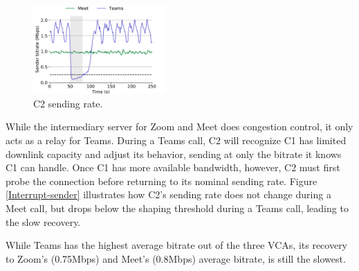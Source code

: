 \begin{figure}[]
    \centering
    \includegraphics[width=0.45\textwidth,keepaspectratio]{../figures/interrupt/Interrupt-sender.pdf}
    \caption{C2 sending rate.}
    \label{fig:Interrupt-sender}
\end{figure}

While the intermediary server for Zoom and Meet does congestion control, it only acts as a relay for Teams. During a Teams call, C2 will recognize C1 has limited downlink capacity and adjust its behavior, sending at only the bitrate it knows C1 can handle. Once C1 has more available bandwidth, however, C2 must first probe the connection before returning to its nominal sending rate. Figure \ref{Interrupt-sender} illustrates how C2's sending rate does not change during a Meet call, but drops below the shaping threshold during a Teams call, leading to the slow recovery.

While Teams has the highest average bitrate out of the three VCAs, its recovery to Zoom's (0.75Mbps) and Meet's (0.8Mbps) average bitrate, is still the slowest. 








